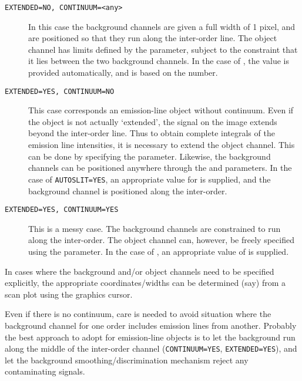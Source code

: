 \begin{description}

\item [{\tt EXTENDED=NO, CONTINUUM=<any>}] In this case the background
      channels are given a full width of 1 pixel, and are positioned so that
      they run along the inter-order line.  The object channel has limits
      defined by the  parameter, subject
      to the constraint that it
      lies between the two background channels.  In the case of
      , the
       value is provided automatically,
      and is based on the  number.

\item [{\tt EXTENDED=YES, CONTINUUM=NO}] This case corresponds an
      emission-line object without continuum.  Even if the object is not
      actually `extended', the signal on the image extends beyond the
      inter-order line.  Thus to obtain complete integrals of the emission
      line intensities, it is necessary to extend the object channel.  This
      can be done by specifying the  parameter.
      Likewise, the
      background channels can be positioned anywhere through the
      and  parameters.  In the case of
      \verb+AUTOSLIT=YES+, an
      appropriate value for  is supplied, and
      the background
      channel is positioned along the inter-order.

\item [{\tt EXTENDED=YES, CONTINUUM=YES}] This is a messy case.  The
      background channels are constrained to run along the inter-order.
      The object channel can, however, be freely specified using the
       parameter.
      In the case of , an
      appropriate value of  is supplied.

\end{description}

In cases where the background and/or object channels need to be
specified explicitly, the appropriate coordinates/widths can be
determined (say) from a scan plot using the graphics cursor.

Even if there is no continuum, care is needed to avoid situation where the
background channel for one order includes emission lines from another.
Probably the best approach to adopt for emission-line objects is to let
the background run along the middle of the inter-order channel
(\verb+CONTINUUM=YES+, \verb+EXTENDED=YES+), and  let  the  background
smoothing/discrimination mechanism reject any contaminating signals.

